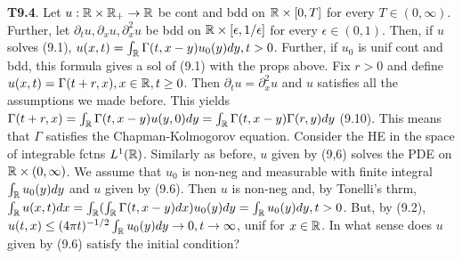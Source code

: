 {\bf T9.4}. Let $u:\mathbb{R} \times \mathbb{R}_+ \rightarrow \mathbb{R}$ be cont and bdd on $\mathbb{R} \times [0, T]$ for every $T \in (0, \infty)$. Further, let $\partial_t u, \partial_x u, \partial_x^2 u$ be bdd on $\mathbb{R} \times [\epsilon, 1/\epsilon]$ for every $\epsilon \in (0, 1)$. Then, if $u$ solves (9.1), $u(x,t) = \int_{\mathbb{R}} \Gamma(t, x-y) u_0(y) dy, t > 0$. Further, if $u_0$ is unif cont and bdd, this formula gives a sol of (9.1) with the props above. Fix $r >0$ and define $u(x,t) = \Gamma(t+r,x), x \in \mathbb{R}, t \geq 0$. Then $\partial_t u = \partial_x^2 u$ and $u$ satisfies all the assumptions we made before.  This yields $\Gamma(t+r, x) = \int_{\mathbb{R}} \Gamma(t, x-y) u(y,0)dy = \int_{\mathbb{R}}\Gamma(t, x-y) \Gamma (r,y)dy$ (9.10). This means that $\Gamma$ satisfies the Chapman-Kolmogorov equation. Consider the HE in  the space of integrable fctns $L^1(\mathbb{R})$. Similarly as before, $u$ given by (9,6) solves the PDE on $\mathbb{R} \times (0, \infty)$. We assume that $u_0$ is non-neg and measurable with finite integral $\int_{\mathbb{R}}u_0(y)dy$ and $u$ given by (9.6). Then $u$ is non-neg and, by Tonelli's thrm, $\int_{\mathbb{R}}u(x,t)dx = \int_{\mathbb{R}}(\int_{\mathbb{R}} \Gamma(t,x-y) dx) u_0(y) dy=\int_{\mathbb{R}} u_0(y)dy, t > 0$. But, by (9.2), $u(t,x) \leq (4 \pi t)^{-1/2} \int_{\mathbb{R}}u_0(y)dy \rightarrow 0, t \rightarrow \infty$, unif for $x \in \mathbb{R}$. In what sense does $u$ given by (9.6) satisfy the initial condition?